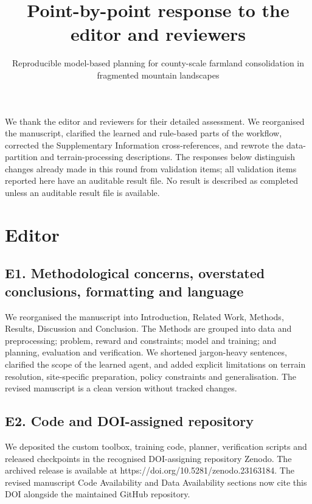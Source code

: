 ﻿\documentclass[11pt]{article}
\begin{document}
\title{Point-by-point response to the editor and reviewers}
\author{\parbox{0.82\textwidth}{\centering Reproducible model-based planning for county-scale farmland consolidation in fragmented mountain landscapes}}
\date{}
\maketitle
\sloppy

We thank the editor and reviewers for their detailed assessment. We reorganised the manuscript, clarified the learned and rule-based parts of the workflow, corrected the Supplementary Information cross-references, and rewrote the data-partition and terrain-processing descriptions. The responses below distinguish changes already made in this round from validation items; all validation items reported here have an auditable result file. No result is described as completed unless an auditable result file is available.

\section*{Editor}
\subsection*{E1. Methodological concerns, overstated conclusions, formatting and language}
We reorganised the manuscript into Introduction, Related Work, Methods, Results, Discussion and Conclusion. The Methods are grouped into data and preprocessing; problem, reward and constraints; model and training; and planning, evaluation and verification. We shortened jargon-heavy sentences, clarified the scope of the learned agent, and added explicit limitations on terrain resolution, site-specific preparation, policy constraints and generalisation. The revised manuscript is a clean version without tracked changes.

\subsection*{E2. Code and DOI-assigned repository}
We deposited the custom toolbox, training code, planner, verification scripts and released checkpoints in the recognised DOI-assigning repository Zenodo. The archived release is available at https://doi.org/10.5281/zenodo.23163184. The revised manuscript Code Availability and Data Availability sections now cite this DOI alongside the maintained GitHub repository.
\end{document}
